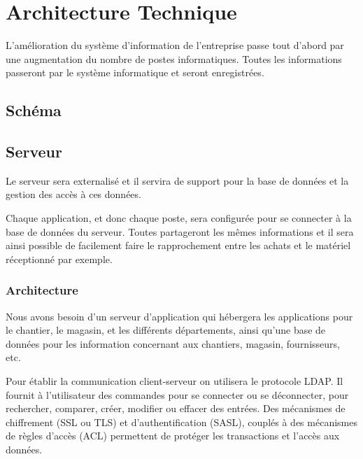 \section{Architecture Technique}
L'amélioration du système d’information de l'entreprise passe tout d'abord
par une augmentation du nombre de postes informatiques. Toutes les
informations passeront par le système informatique et seront enregistrées.

\subsection{Schéma}



\subsection{Serveur}

Le serveur sera externalisé et il servira de support pour la base de
données et la gestion des accès à ces données. 

Chaque application, et donc chaque poste, sera configurée pour se connecter
à la base de données du serveur.  Toutes partageront les mêmes informations
et il sera ainsi possible de facilement faire le rapprochement entre les
achats et le matériel réceptionné par exemple.

	\subsubsection{Architecture}
Nous avons besoin d'un serveur d'application qui hébergera les applications
pour le chantier, le magasin, et les différents départements,  ainsi qu'une
base de données pour les information concernant aux chantiers, magasin,
fournisseurs, etc. 

Pour établir la communication client-serveur on utilisera le protocole
LDAP. Il fournit à l'utilisateur des commandes pour se connecter ou se
déconnecter,  pour rechercher, comparer, créer, modifier ou effacer des
entrées.  Des mécanismes de chiffrement (SSL ou TLS) et d'authentification
(SASL), couplés à des mécanismes de règles d'accès (ACL) permettent de
protéger les transactions et l'accès aux données.

